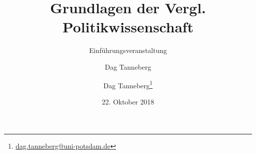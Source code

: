\usepackage[ngerman]{babel}
\usepackage{graphicx}
\usepackage{hyperref}
\usepackage{multirow}
\usepackage{booktabs}

\author{Dag Tanneberg}
\title{Grundlagen der Vergl. Politikwissenschaft}
\subtitle{Einführungsveranstaltung}
\author{Dag Tanneberg\thanks{%
  \href{mailto:dag.tanneberg@uni-potsdam.de}%
    {dag.tanneberg@uni-potsdam.de}
  }
}
\date{22. Oktober 2018}
\hypersetup{colorlinks, urlcolor = red, linkcolor = }